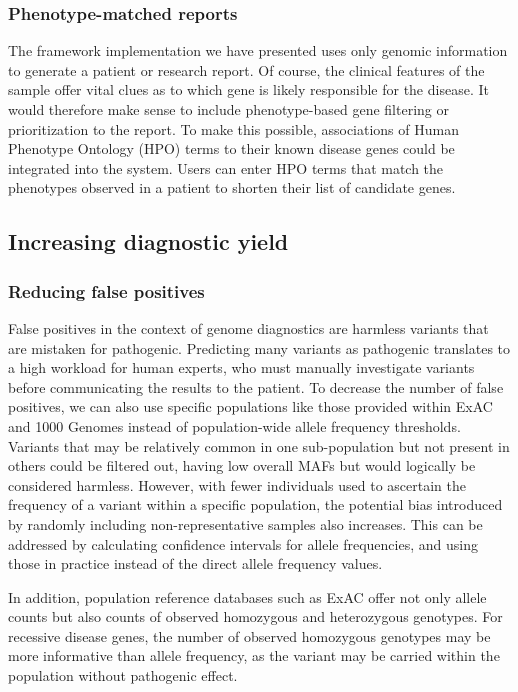 \subsubsection{Phenotype-matched reports}
The framework implementation we have presented uses only genomic information to generate a patient or research report.
Of course, the clinical features of the sample offer vital clues as to which gene is likely responsible for the disease.
It would therefore make sense to include phenotype-based gene filtering or prioritization to the report.
To make this possible, associations of Human Phenotype Ontology (HPO) terms\cite{Robinson_2010} to their known disease genes could be integrated into the system.
Users can enter HPO terms that match the phenotypes observed in a patient to shorten their list of candidate genes.

\subsection{Increasing diagnostic yield}

\subsubsection{Reducing false positives}
False positives in the context of genome diagnostics are harmless variants that are mistaken for pathogenic.
Predicting many variants as pathogenic translates to a high workload for human experts, who must manually investigate variants before communicating the results to the patient.
To decrease the number of false positives, we can also use specific populations like those provided within ExAC and 1000 Genomes instead of population-wide allele frequency thresholds.
Variants that may be relatively common in one sub-population but not present in others could be filtered out, having low overall MAFs but would logically be considered harmless.
However, with fewer individuals used to ascertain the frequency of a variant within a specific population, the potential bias introduced by randomly including non-representative samples also increases.
This can be addressed by calculating confidence intervals for allele frequencies, and using those in practice instead of the direct allele frequency values.

In addition,  population reference databases such as ExAC offer not only allele counts but also counts of observed homozygous and heterozygous genotypes.
For recessive disease genes, the number of observed homozygous genotypes may be more informative than allele frequency, as the variant may be carried within the population without pathogenic effect.

